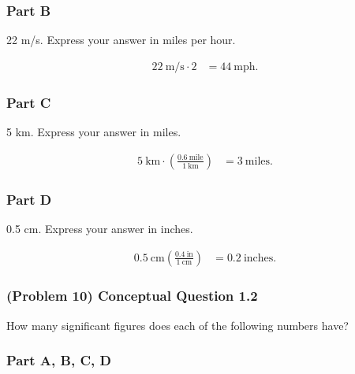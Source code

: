 \subsubsection{Part B}

22 m/s. Express your answer in miles per hour.

\vspace{1em}

\begin{solution}
	\begin{align*}
		22~\text{m/s} \cdot 2 &= 44~\text{mph}
		.\end{align*}
\end{solution}

\subsubsection{Part C}

5 km. Express your answer in miles.

\vspace{1em}

\begin{solution}
	\begin{align*}
		5~\text{km} \cdot \left( \frac{0.6~\text{mile}}{1~\text{km}} \right) &= 3~\text{miles}
		.\end{align*}
\end{solution}

\subsubsection{Part D}

0.5 cm. Express your answer in inches.

\vspace{1em}

\begin{solution}
	\begin{align*}
		0.5~\text{cm} \left( \frac{0.4~\text{in}}{1~\text{cm}} \right) &= 0.2~\text{inches}
		.\end{align*}
\end{solution}

\subsubsection{(Problem 10) Conceptual Question 1.2}

How many significant figures does each of the following numbers have?

\subsubsection{Part A, B, C, D}

